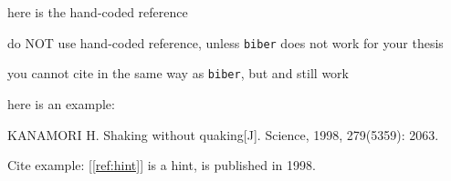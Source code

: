 \chapter{\bibname}

\begin{manref}
\item \label{ref:hint} here is the hand-coded reference
\item do NOT use hand-coded reference, unless \texttt{biber} does not work for your thesis
\item you cannot cite in the same way as \texttt{biber}, but  and  still work
\item here is an example:
\item \label{ref:man} KANAMORI H. Shaking without quaking[J]. Science, 1998, 279(5359): 2063.
\end{manref}

Cite example:
[\ref{ref:hint}] is a hint,
 is published in 1998.

